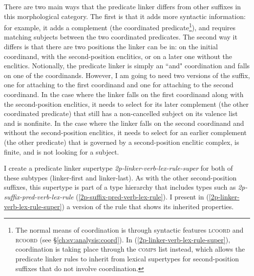 There are two main ways that the predicate linker differs from other suffixes in this morphological category. The first is that it adds more syntactic information: for example, it adds a complement (the coordinated predicate\footnote{The normal means of coordination is through syntactic features \textsc{lcoord} and \textsc{rcoord} (see \S\ref{ch:sv:analysis:coord}). In (\ref{2p-linker-verb-lex-rule-super}), coordination is taking place through the \textsc{comps} list instead, which allows the predicate linker rules to inherit from lexical supertypes for second-position suffixes that do not involve coordination.}), and requires matching subjects between the two coordinated predicates. The second way it differs is that there are two positions the linker can be in: on the initial coordinand, with the second-position enclitics, or on a later one without the enclitics. Notionally, the predicate linker is simply an ``and" coordination and falls on one of the coordinands. However, I am going to need two versions of the suffix, one for attaching to the first coordinand and one for attaching to the second coordinand. In the case where the linker falls on the first coordinand along with the second-position enclitics, it needs to select for its later complement (the other coordinated predicate) that still has a non-cancelled subject on its valence list and is nonfinite. In the case where the linker falls on the second coordinand and without the second-position enclitics, it needs to select for an earlier complement (the other predicate) that is governed by a second-position enclitic complex, is finite, and is not looking for a subject.

I create a predicate linker supertype {\textit{2p-linker-verb-lex-rule-super}} for both of these subtypes (linker-first and linker-last). As with the other second-position suffixes, this supertype is part of a type hierarchy that includes types such as {\textit{2p-suffix-pred-verb-lex-rule}} (\ref{2p-suffix-pred-verb-lex-rule}). I present in (\ref{2p-linker-verb-lex-rule-super}) a version of the rule that shows its inherited properties.

